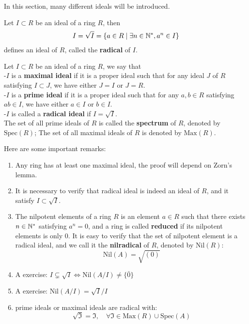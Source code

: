 \documentclass[12pt,a4paper]{article}
\begin{document}
In this section, many different ideals will be introduced.
\begin{lemma}
    Let \(I \subset R\) be an ideal of a ring \(R\), then 
    \[I = \sqrt{I} = \{a \in R \mid \exists n \in \mathbb{N}^*, a^n \in I\}\]
    defines an ideal of \(R\), called the \textbf{radical} of \(I\).
\end{lemma}

\begin{definition}
    Let \(I \subset R\) be an ideal of a ring \(R\), we say that\\

    -\(I\) is a \textbf{maximal ideal} if it is a proper ideal such that for any ideal \(J\) of \(R\) satisfying \(I \subset J \), we have either \(J = I\) or \(J = R\).\\

    -\(I\) is a \textbf{prime ideal} if it is a proper ideal such that for any \(a,b \in R\) satisfying \(ab \in I\), we have either \(a \in I\) or \(b \in I\).\\

    -\(I\) is called a \textbf{radical ideal} if \(I = \sqrt{I}\).\\

    The set of all prime ideals of \(R\) is called the \textbf{spectrum} of \(R\), denoted by \(\mathrm{Spec}(R)\); The set of all maximal ideals of \(R\) is denoted by \(\mathrm{Max}(R)\).
\end{definition}

Here are some important remarks:
\begin{enumerate}
    \item Any ring has at least one maximal ideal, the proof will depend on 
    Zorn's lemma.

    \item It is necessary to verify that radical ideal is indeed an ideal of \(R\), and it satisfy \(I \subset \sqrt{I}\).

    \item The nilpotent elements of a ring \(R\) is an element \(a \in R\) such that there exists \(n \in \mathbb{N}^*\) satisfying \(a^n = 0\), and a ring is called \textbf{reduced} if its nilpotent elements is only \(0\). It is easy to verify that the set of nilpotent element is a radical ideal, and we call it the \textbf{nilradical} of \(R\), denoted by \(\mathrm{Nil}(R)\):
    \[\mathrm{Nil}(A) = \sqrt{(0)}\]

    \item A exercise: \(I \subsetneq \sqrt{I} \iff \mathrm{Nil}(A/I) \neq \{\bar{0}\}\)

    \item A exercise: \(\mathrm{Nil}(A/I) = \sqrt{I}/I\)

    \item prime ideals or maximal ideals are radical with:
    \[\sqrt{\mathfrak{I}} = \mathfrak{I}, \quad \forall \mathfrak{I} \in \mathrm{Max}(R) \cup \mathrm{Spec}(A)\]
\end{enumerate}
\end{document}

